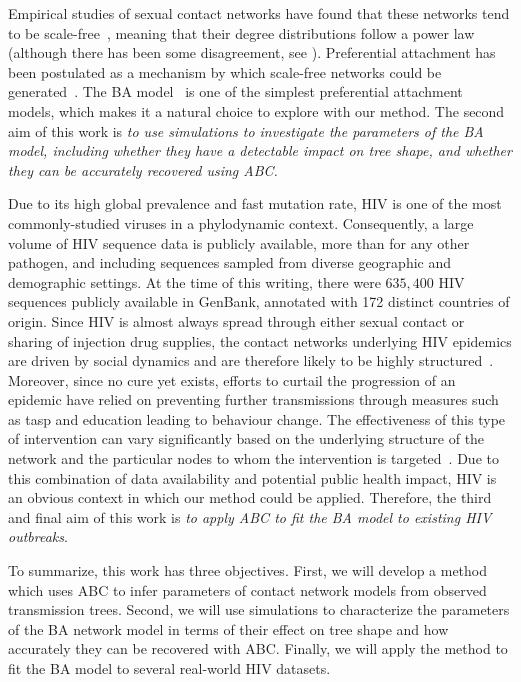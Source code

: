 {{Empirical studies of sexual contact networks have found that these networks
tend to be scale-free~\autocite{colgate1989risk, liljeros2001web,
schneeberger2004scale,clemenccon2015statistical}, meaning that their degree
distributions follow a power law (although there has been some disagreement,
see \autocite{handcock2004likelihood, bansal2007individual}). Preferential
attachment has been postulated as a mechanism by which scale-free networks
could be generated~\autocite{barabasi1999emergence}. The \gls{BA}
model~\autocite{barabasi1999emergence} is one of the simplest preferential
attachment models, which makes it a natural choice to explore with our method.
The second aim of this work is \emph{to use simulations to investigate the
parameters of the \gls{BA} model, including whether they have a detectable
impact on tree shape, and whether they can be accurately recovered using
\gls{ABC}.}

Due to its high global prevalence and fast mutation rate, \gls{HIV} is one of
the most commonly-studied viruses in a phylodynamic context. Consequently, a
large volume of \gls{HIV} sequence data is publicly available, more than for
any other pathogen, and including sequences sampled from diverse geographic and
demographic settings. At the time of this writing, there were $635,400$ HIV
sequences publicly available in GenBank, annotated with 172 distinct countries
of origin. Since \gls{HIV} is almost always spread through either sexual
contact or sharing of injection drug supplies, the contact networks underlying
\gls{HIV} epidemics are driven by social dynamics and are therefore likely to
be highly structured~\autocite{clemenccon2015statistical}. Moreover, since no
cure yet exists, efforts to curtail the progression of an epidemic have relied
on preventing further transmissions through measures such as \gls{tasp} and
education leading to behaviour change. The effectiveness of this type of
intervention can vary significantly based on the underlying structure of the
network and the particular nodes to whom the intervention is
targeted~\autocite{little2014using,wang2015targeting}. Due to this combination
of data availability and potential public health impact, \gls{HIV} is an
obvious context in which our method could be applied. Therefore, the third and
final aim of this work is \emph{to apply \gls{ABC} to fit the \gls{BA} model to
existing \gls{HIV} outbreaks}.

To summarize, this work has three objectives. First, we will develop a method
which uses \gls{ABC} to infer parameters of contact network models from
observed transmission trees. Second, we will use simulations to characterize
the parameters of the \gls{BA} network model in terms of their effect on tree
shape and how accurately they can be recovered with \gls{ABC}. Finally, we will
apply the method to fit the \gls{BA} model to several real-world \gls{HIV}
datasets.

}}
